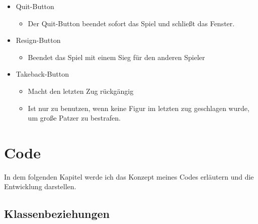 \documentclass[a4paper, 10pt]{scrartcl}
\begin{document}
\begin{itemize}
        \item \glqq Quit\grqq-Button
        \begin{itemize}
                \item Der Quit-Button beendet sofort das Spiel und schließt das Fenster.
        \end{itemize}
        \item \glqq Resign\grqq-Button
        \begin{itemize}
                \item Beendet das Spiel mit einem Sieg für den anderen Spieler
        \end{itemize}
        \item \glqq Takeback\grqq-Button
        \begin{itemize}
                \item Macht den letzten Zug rückgängig
                \item Ist nur zu benutzen, wenn keine Figur im 
                letzten zug geschlagen wurde, um große Patzer zu bestrafen.
        \end{itemize}
\end{itemize}



\section{Code}
In dem folgenden Kapitel werde ich das Konzept meines Codes erläutern und die Entwicklung darstellen. 

\pagebreak
\subsection{Klassenbeziehungen}
\end{document}
